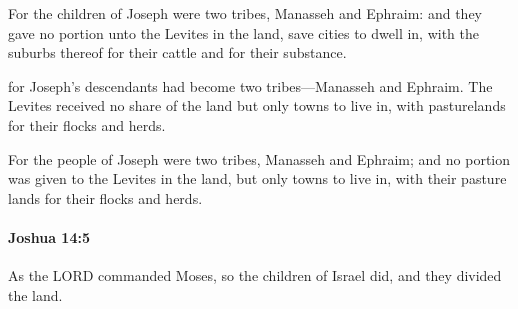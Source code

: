 			\begin{versebox}
					\item[BHS] 
					\item[ASV] For the children of Joseph were two tribes, Manasseh and Ephraim: and they gave no portion unto the Levites in the land, save cities to dwell in, with the suburbs thereof for their cattle and for their substance.
					\item[NIV] for Joseph’s descendants had become two tribes—Manasseh and Ephraim. The Levites received no share of the land but only towns to live in, with pasturelands for their flocks and herds.
					\item[NRSV] For the people of Joseph were two tribes, Manasseh and Ephraim; and no portion was given to the Levites in the land, but only towns to live in, with their pasture lands for their flocks and herds.
			\end{versebox}

		\paragraph{Joshua 14:5} %
			\label{JOSHUA-14-5}

			As the LORD commanded Moses, so the children of Israel did, and they divided the land.

